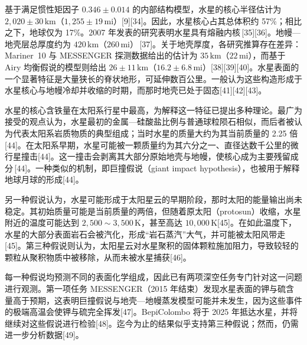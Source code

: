 基于满足惯性矩因子 \(0.346\pm0.014\) 的内部结构模型，水星的核心半径估计为 \(2{,}020\pm30\,\mathrm{km}\)（\(1{,}255\pm19\,\mathrm{mi}\)）[9][34]。因此，水星核心占其总体积约 57\%；相比之下，地球仅为 17\%。2007 年发表的研究表明水星具有熔融内核\,[35][36]。地幔—地壳层总厚度约为 \(420\,\mathrm{km}\)（\(260\,\mathrm{mi}\)）\,[37]。关于地壳厚度，各研究推算存在差异：Mariner~10 与 MESSENGER 探测数据给出的估计为 \(35\,\mathrm{km}\)（\(22\,\mathrm{mi}\)），而基于 Airy 均衡假说的模型则给出 \(26\pm11\,\mathrm{km}\)（\(16.2\pm6.8\,\mathrm{mi}\)）[38][39][40]。水星表面的一个显著特征是大量狭长的脊状地形，可延伸数百公里。一般认为这些构造形成于水星核心与地幔冷却并收缩的时期，而那时地壳已处于固态[41][42][43]。

水星的核心含铁量在太阳系行星中最高，为解释这一特征已提出多种理论。最广为接受的观点认为，水星最初的金属—硅酸盐比例与普通球粒陨石相似，而后者被认为代表太阳系岩质物质的典型组成；当时水星的质量大约为其当前质量的 2.25 倍[44]。在太阳系早期，水星可能被一颗质量约为其六分之一、直径达数千公里的微行星撞击[44]。这一撞击会剥离其大部分原始地壳与地幔，使核心成为主要残留成分\,[44]。一种类似的机制，即巨撞假说（giant impact hypothesis），也被用于解释地球月球的形成[44]。

另一种假说认为，水星可能形成于太阳星云的早期阶段，那时太阳的能量输出尚未稳定。其初始质量可能是当前质量的两倍，但随着原太阳（protosun）收缩，水星附近的温度可能达到 \(2{,}500\sim3{,}500\,\mathrm{K}\)，甚至高达 \(10{,}000\,\mathrm{K}\)[45]。在如此温度下，水星的大部分表面岩石会被汽化，形成“岩石蒸汽”大气，并可能被太阳风带走\,[45]。第三种假说则认为，太阳星云对水星聚积的固体颗粒施加阻力，导致较轻的颗粒从聚积物质中被移除，从而未被水星捕获[46]。

每一种假说均预测不同的表面化学组成，因此已有两项深空任务专门针对这一问题进行观测。第一项任务 MESSENGER（2015 年结束）发现水星表面的钾与硫含量高于预期，这表明巨撞假说与地壳—地幔蒸发模型可能并未发生，因为这些事件的极端高温会使钾与硫完全挥发[47]。BepiColombo 将于 2025 年抵达水星，并将继续对这些假说进行检验[48]。迄今为止的结果似乎支持第三种假说；然而，仍需进一步分析数据[49]。
